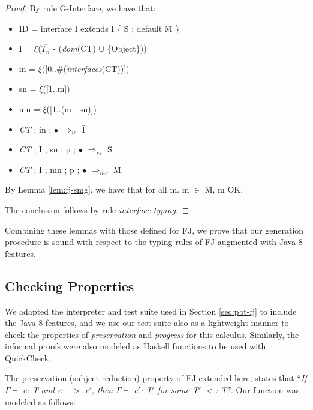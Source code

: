 \documentclass[tese,capa,english]{texufpel}
\begin{document}
\begin{proof}
By rule {\footnotesize G-Interface}, we have that:

\begin{itemize}
\item ID = interface I extends \={I} \{ \={S} ; default \={M} \}
\item I = $\xi$($\overline{T_n}$ - (\emph{dom}(CT) $\cup$ \{Object\}))
\item in = $\xi$([0..\#(\emph{interfaces}(CT))])
\item sn = $\xi$([$1..$m])
\item mn = $\xi$([$1..$(m - sn)])
\item \emph{CT} ; in ; $\bullet$ $\Rightarrow_{is}$ \={I}
\item \emph{CT} ; I ; sn ; p ; $\bullet$ $\Rightarrow_{ss}$ \={S}
\item \emph{CT} ; I ; mn ; p ; $\bullet$ $\Rightarrow_{ms}$ \={M}
\end{itemize}

By Lemma \ref{lem:fj-smg}, we have that for all m. m $\in$ \={M}, m OK.

The conclusion follows by rule \emph{interface typing}.
\end{proof}

Combining these lemmas with those defined for FJ, we prove that our generation procedure is sound with respect to the typing rules of FJ augmented with Java 8 features.

\subsection{Checking Properties}

We adapted the interpreter and test suite used in Section \ref{sec:pbt-fj} to include the Java 8 features, and we use our test suite also as a lightweight manner to check the properties of \emph{preservation} and \emph{progress} for this calculus. Similarly, the informal proofs were also modeled as Haskell functions to be used with QuickCheck. 

The preservation (subject reduction) property of FJ extended here, states that ``\emph{If $\Gamma \vdash$ \textnormal{e: T} and \textnormal{e} $->$ \textnormal{e}$'$, then $\Gamma \vdash$ \textnormal{e}$'$\textnormal{: T}$'$ \textnormal for some \textnormal{T}$'$ $<$\textnormal{:} \textnormal{T}}.''. Our function was modeled as follows:
\end{document}
